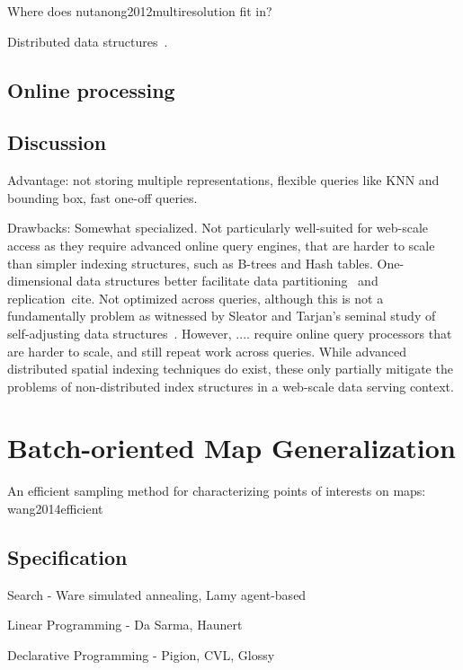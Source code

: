 \documentclass[11pt, oneside]{report}
\begin{document}
Where does nutanong2012multiresolution fit in?

Distributed data structures~\cite{paralleluniverse2012spacebase}.

\subsection{Online processing}

\subsection{Discussion}
Advantage: not storing multiple representations, flexible queries like KNN and bounding box, fast one-off queries.

Drawbacks: Somewhat specialized. Not particularly well-suited for web-scale access as they  require advanced online query engines, that are harder to scale than simpler indexing structures, such as B-trees and Hash tables. One-dimensional data structures better facilitate data partitioning~\cite{consistenthashing} and replication~cite{}.  Not optimized across queries, although this is not a fundamentally problem as witnessed by Sleator and Tarjan's seminal study of self-adjusting data structures~\cite{tarjan1985selfadjusting}. However, .... require online query processors that are harder to scale, and still repeat work across queries. While advanced distributed spatial indexing techniques do exist, these only partially mitigate the problems of non-distributed index structures in a web-scale data serving context.

\section{Batch-oriented Map Generalization}

An efficient sampling method for characterizing points of interests on maps: wang2014efficient

\subsection{Specification}

Search
- Ware simulated annealing, Lamy agent-based

Linear Programming
- Da Sarma, Haunert

Declarative Programming
- Pigion, CVL, Glossy

\end{document}
